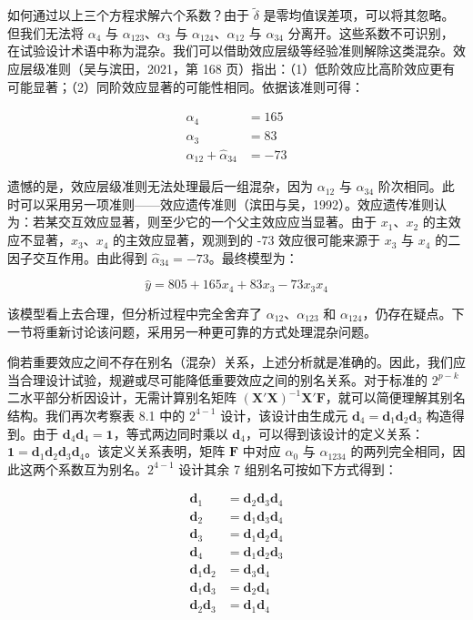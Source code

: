 \documentclass{ctexart}
\begin{document}
如何通过以上三个方程求解六个系数？由于 $\widetilde{\delta}$ 是零均值误差项，可以将其忽略。但我们无法将 $\alpha_4$ 与 $\alpha_{123}$、$\alpha_3$ 与 $\alpha_{124}$、$\alpha_{12}$ 与 $\alpha_{34}$ 分离开。这些系数不可识别，在试验设计术语中称为混杂。我们可以借助效应层级等经验准则解除这类混杂。效应层级准则（吴与滨田，2021，第 168 页）指出：（1）低阶效应比高阶效应更有可能显著；（2）同阶效应显著的可能性相同。依据该准则可得：

\begin{align*}
\widehat{\alpha}_4&=165\\
\widehat{\alpha}_3&=83\\
\widehat{\alpha}_{12}+\widehat{\alpha}_{34}&=-73
\end{align*}

遗憾的是，效应层级准则无法处理最后一组混杂，因为 $\alpha_{12}$ 与 $\alpha_{34}$ 阶次相同。此时可以采用另一项准则——效应遗传准则（滨田与吴，1992）。效应遗传准则认为：若某交互效应显著，则至少它的一个父主效应应当显著。由于 $x_1$、$x_2$ 的主效应不显著，$x_3$、$x_4$ 的主效应显著，观测到的 $‑73$ 效应很可能来源于 $x_3$ 与 $x_4$ 的二因子交互作用。由此得到 $\widehat{\alpha}_{34}=-73$。最终模型为：

\begin{equation*}
\widehat{y}=805+165x_4+83x_3-73x_3x_4
\end{equation*}

该模型看上去合理，但分析过程中完全舍弃了 $\alpha_{12}$、$\alpha_{123}$ 和 $\alpha_{124}$，仍存在疑点。下一节将重新讨论该问题，采用另一种更可靠的方式处理混杂问题。

倘若重要效应之间不存在别名（混杂）关系，上述分析就是准确的。因此，我们应当合理设计试验，规避或尽可能降低重要效应之间的别名关系。对于标准的 $2^{p-k}$ 二水平部分析因设计，无需计算别名矩阵 $(\boldsymbol{X}'\boldsymbol{X})^{-1}\boldsymbol{X}'\boldsymbol{F}$，就可以简便理解其别名结构。我们再次考察表 8.1 中的 $2^{4-1}$ 设计，该设计由生成元 $\boldsymbol{d}_4=\boldsymbol{d}_1\boldsymbol{d}_2\boldsymbol{d}_3$ 构造得到。由于 $\boldsymbol{d}_4\boldsymbol{d}_4=\boldsymbol{1}$，等式两边同时乘以 $\boldsymbol{d}_4$，可以得到该设计的定义关系：$\boldsymbol{1}=\boldsymbol{d}_1\boldsymbol{d}_2\boldsymbol{d}_3\boldsymbol{d}_4$。该定义关系表明，矩阵 $\boldsymbol{F}$ 中对应 $\alpha_0$ 与 $\alpha_{1234}$ 的两列完全相同，因此这两个系数互为别名。$2^{4-1}$ 设计其余 7 组别名可按如下方式得到：

\begin{align*}
\boldsymbol{d}_1&=\boldsymbol{d}_2\boldsymbol{d}_3\boldsymbol{d}_4\\
\boldsymbol{d}_2&=\boldsymbol{d}_1\boldsymbol{d}_3\boldsymbol{d}_4\\
\boldsymbol{d}_3&=\boldsymbol{d}_1\boldsymbol{d}_2\boldsymbol{d}_4\\
\boldsymbol{d}_4&=\boldsymbol{d}_1\boldsymbol{d}_2\boldsymbol{d}_3\\
\boldsymbol{d}_1\boldsymbol{d}_2&=\boldsymbol{d}_3\boldsymbol{d}_4\\
\boldsymbol{d}_1\boldsymbol{d}_3&=\boldsymbol{d}_2\boldsymbol{d}_4\\
\boldsymbol{d}_2\boldsymbol{d}_3&=\boldsymbol{d}_1\boldsymbol{d}_4
\end{align*}
\end{document}
